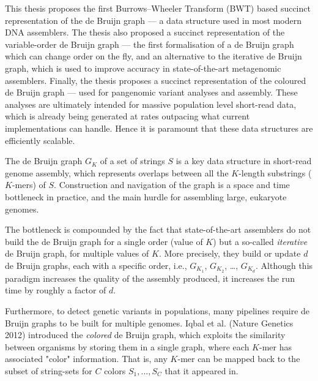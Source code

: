 
This thesis proposes the first Burrows--Wheeler Transform (BWT) based
 succinct representation of the de Bruijn graph --- a data
structure used in most modern DNA assemblers.
The thesis also proposed a succinct representation of the variable-order de Bruijn graph --- the first formalisation of
a de Bruijn graph which can change order on the fly, and an alternative to the iterative de Bruijn graph,
which is used to improve accuracy in state-of-the-art metagenomic assemblers.
Finally, the thesis proposes a succinct representation of the coloured de Bruijn graph --- used for pangenomic
variant analyses and assembly.
These analyses are ultimately intended for massive population level short-read data, which is already being
generated at rates outpacing what current implementations can handle.
Hence it is paramount that these data structures are efficiently scalable.

The de Bruijn graph $G_K$ of a set of strings $S$ is a key data structure in short-read genome assembly,
which represents overlaps between all the $K$-length substrings ($K$-mers) of $S$. Construction and navigation of the
graph is a space and time bottleneck in practice, and the main hurdle for assembling large, eukaryote genomes.

The bottleneck is compounded by the fact that state-of-the-art assemblers do not build the
de Bruijn graph for a single order (value of $K$) but a so-called \textit{iterative} de Bruijn graph, for
multiple values of $K$. More precisely, they build or update $d$ de Bruijn graphs, each with a specific
order, i.e., $G_{K_1}$,  $G_{K_2}$, \ldots,  $G_{K_d}$. Although this paradigm increases the quality of the assembly produced,
it increases the run time by roughly a factor of $d$.

Furthermore, to detect genetic variants in populations, many pipelines require de Bruijn graphs
to be built for multiple genomes. Iqbal et al. (Nature Genetics 2012) introduced the \textit{colored} de
Bruijn graph, which exploits the similarity between organisms by storing them in a single graph, where
each $K$-mer has associated "color" information. That is, any $K$-mer can be mapped back to the subset of
string-sets for $C$ colors ${S_1, \ldots, S_C}$ that it appeared in.

